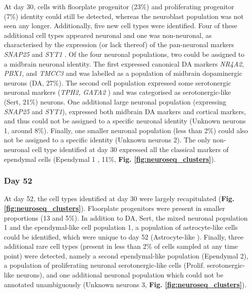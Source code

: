 At day 30, cells with floorplate progenitor (23\%) and proliferating progenitor (7\%) identity could still be detected, whereas the neuroblast population was not seen any longer.
Additionally, five new cell types were identified.
Four of these additional cell types appeared neuronal and one was non-neuronal, as characterised by the expression (or lack thereof) of the pan-neuronal markers \textit{SNAP25} and \textit{SYT1} \cite{arenas2015make}.
Of the four neuronal populations, two could be assigned to a midbrain neuronal identity.
The first expressed canonical DA markers \textit{NR4A2}, \textit{PBX1}, and \textit{TMCC3} \cite{la2016molecular, park2006acquisition, ramonet2012park9} and was labelled as a population of midbrain dopaminergic neurons (DA, 27\%).
The second cell population expressed some serotonergic neuronal markers (\textit{TPH2, GATA2} \cite{cummings2019serotonergic}) and was categorised as serotonergic-like (Sert, 21\%) neurons. 
One additional large neuronal population (expressing \textit{SNAP25} and \textit{SYT1}), expressed both midbrain DA markers and cortical markers,
and thus could not be assigned to a specific neuronal identity (Unknown neurons 1, around 8\%).
Finally, one smaller neuronal population (less than 2\%) could also not be assigned to a specific identity (Unknown neurons 2). 
The only non-neuronal cell type identified at day 30 expressed all the classical markers of ependymal cells (Ependymal 1 \cite{campbell2017molecular}, 11\%,\textbf{ Fig. \ref{fig:neuroseq_clusters}}). 

\subsubsection{Day 52}

At day 52, the cell types identified at day 30 were largely recapitulated (\textbf{Fig. \ref{fig:neuroseq_clusters}}).
Floorplate progenitors were present in smaller proportions (13 and 5\%).
In addition to DA, Sert, the mixed neuronal population 1 and the ependymal-like cell population 1, a population of astrocyte-like cells could be identified, which were unique to day 52 (Astrocyte-like \cite{sloan2017human, zhang2016purification}). 
Finally, three additional rare cell types (present in less than 2\% of cells sampled at any time point) were detected, namely a second ependymal-like population (Ependymal 2), a population of proliferating neuronal serotonergic-like cells (Prolif. serotonergic-like neurons), and one additional neuronal population which could not be annotated unambiguously (Unknown neurons 3, \textbf{Fig. \ref{fig:neuroseq_clusters}}). \\

